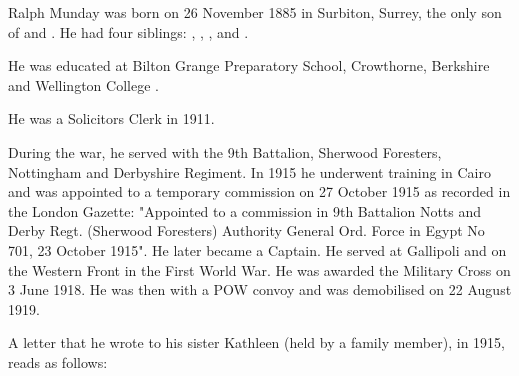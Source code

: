 
Ralph Munday was born on 26 November 1885 in Surbiton, Surrey\cite{RMundayBirth}, the only son of  and .
He had four siblings: , , , and .

He was educated at Bilton Grange Preparatory School, Crowthorne, Berkshire and Wellington College \cite{RMundayEducation}.

He was a Solicitors Clerk in 1911\cite{RMundayOccupation}.

During the war, he served with the 9th Battalion, Sherwood Foresters, Nottingham and Derbyshire Regiment. In 1915 he underwent training in Cairo and was appointed to a temporary commission on 27 October 1915 \cite{RMundayWar} as recorded in the London Gazette:  "Appointed to a commission in 9th Battalion Notts and Derby Regt. (Sherwood Foresters) Authority General Ord. Force in Egypt No 701, 23 October 1915".  He later became a Captain. He  served at Gallipoli and on the Western Front in the First World War. He was awarded the Military Cross on 3 June 1918. He was then with a POW convoy and was demobilised on 22 August 1919.

A letter that he wrote to his sister Kathleen (held by a family member), in 1915, reads as follows:

